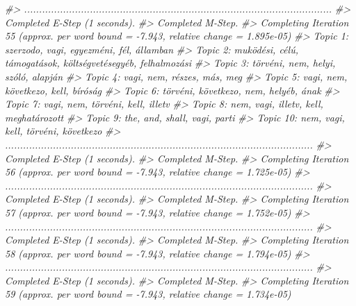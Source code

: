 \documentclass[
]{book}
\newenvironment{Shaded}{\begin{snugshade}}{\end{snugshade}}
\newcommand{\CommentTok}[1]{\textcolor[rgb]{0.56,0.35,0.01}{\textit{#1}}}
\begin{document}
\begin{Shaded}
\begin{Highlighting}[]
\CommentTok{\#\textgreater{} .......................................................................................................}
\CommentTok{\#\textgreater{} Completed E{-}Step (1 seconds). }
\CommentTok{\#\textgreater{} Completed M{-}Step. }
\CommentTok{\#\textgreater{} Completing Iteration 55 (approx. per word bound = {-}7.943, relative change = 1.895e{-}05) }
\CommentTok{\#\textgreater{} Topic 1: szerzodo, vagi, egyezméni, fél, államban }
\CommentTok{\#\textgreater{}  Topic 2: muködési, célú, támogatások, költségvetésegyéb, felhalmozási }
\CommentTok{\#\textgreater{}  Topic 3: törvéni, nem, helyi, szóló, alapján }
\CommentTok{\#\textgreater{}  Topic 4: vagi, nem, részes, más, meg }
\CommentTok{\#\textgreater{}  Topic 5: vagi, nem, következo, kell, bíróság }
\CommentTok{\#\textgreater{}  Topic 6: törvéni, következo, nem, helyéb, ának }
\CommentTok{\#\textgreater{}  Topic 7: vagi, nem, törvéni, kell, illetv }
\CommentTok{\#\textgreater{}  Topic 8: nem, vagi, illetv, kell, meghatározott }
\CommentTok{\#\textgreater{}  Topic 9: the, and, shall, vagi, parti }
\CommentTok{\#\textgreater{}  Topic 10: nem, vagi, kell, törvéni, következo }
\CommentTok{\#\textgreater{} .......................................................................................................}
\CommentTok{\#\textgreater{} Completed E{-}Step (1 seconds). }
\CommentTok{\#\textgreater{} Completed M{-}Step. }
\CommentTok{\#\textgreater{} Completing Iteration 56 (approx. per word bound = {-}7.943, relative change = 1.725e{-}05) }
\CommentTok{\#\textgreater{} .......................................................................................................}
\CommentTok{\#\textgreater{} Completed E{-}Step (1 seconds). }
\CommentTok{\#\textgreater{} Completed M{-}Step. }
\CommentTok{\#\textgreater{} Completing Iteration 57 (approx. per word bound = {-}7.943, relative change = 1.752e{-}05) }
\CommentTok{\#\textgreater{} .......................................................................................................}
\CommentTok{\#\textgreater{} Completed E{-}Step (1 seconds). }
\CommentTok{\#\textgreater{} Completed M{-}Step. }
\CommentTok{\#\textgreater{} Completing Iteration 58 (approx. per word bound = {-}7.943, relative change = 1.794e{-}05) }
\CommentTok{\#\textgreater{} .......................................................................................................}
\CommentTok{\#\textgreater{} Completed E{-}Step (1 seconds). }
\CommentTok{\#\textgreater{} Completed M{-}Step. }
\CommentTok{\#\textgreater{} Completing Iteration 59 (approx. per word bound = {-}7.943, relative change = 1.734e{-}05) }

\end{Highlighting}
\end{Shaded}
\end{document}
